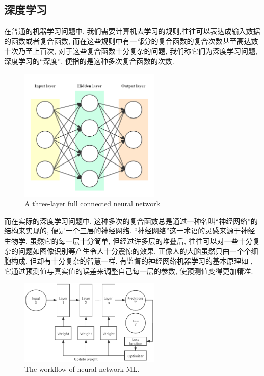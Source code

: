 \documentclass[lang=cn,11pt,a4paper]{elegantpaper}
\begin{document}
\subsection{深度学习}
\par 在普通的机器学习问题中, 我们需要计算机去学习的规则,往往可以表达成输入数据的函数或者复合函数, 而在这些规则中有一部分的复合函数的复合次数甚至高达数十次乃至上百次, 对于这些复合函数十分复杂的问题, 我们称它们为深度学习问题, 深度学习的“深度”, 便指的是这种多次复合函数的次数. 
\begin{figure}[htbp]
	\centering
	\includegraphics[width=0.6\textwidth]{DNN}
  	\caption{A three-layer full connected neural network\label{fig:DNN}}
\end{figure}
\par 而在实际的深度学习问题中, 这种多次的复合函数总是通过一种名叫“神经网络”的结构来实现的,  便是一个三层的神经网络. “神经网络”这一术语的灵感来源于神经生物学. 虽然它的每一层十分简单, 但经过许多层的堆叠后, 往往可以对一些十分复杂的问题如图像识别等产生令人十分震惊的效果. 正像人的大脑虽然只由一个个细胞构成, 但却有十分复杂的智慧一样. 有监督的神经网络机器学习的基本原理如 , 它通过预测值与真实值的误差来调整自己每一层的参数, 使预测值变得更加精准.
\begin{figure}[htbp]
	\centering
	\hspace{-30pt}\includegraphics[width=0.6\textwidth]{Net}
  	\caption{The workflow of neural network ML.\label{fig:net}}
\end{figure}
\end{document}
